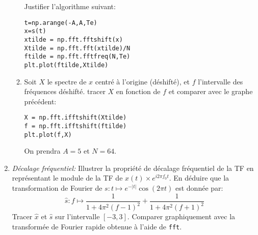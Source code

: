 \documentclass{article}
\begin{document}
\begin{enumerate}
\begin{enumerate}
 Justifier l'algorithme suivant:
\begin{verbatim}
t=np.arange(-A,A,Te)
x=s(t)
xtilde = np.fft.fftshift(x)
Xtilde = np.fft.fft(xtilde)/N
ftilde = np.fft.fftfreq(N,Te)
plt.plot(ftilde,Xtilde)
\end{verbatim}
\item Soit $X$ le spectre de $x$ centré à l'origine (déshifté), et $f$ l'intervalle des fréquences déshifté. tracer $X$ en fonction de $f$ et comparer avec le graphe précédent:
\begin{verbatim}
X = np.fft.ifftshift(Xtilde)
f = np.fft.ifftshift(ftilde)
plt.plot(f,X)
\end{verbatim}
On prendra $A=5$ et $N=64$.
\end{enumerate}
\item {\em Décalage fréquentiel:} Illustrer la propriété de décalage fréquentiel de la TF en représentant le module de la TF de $x(t) \times e^{i2\pi f_0t}$. En déduire que la transformation de Fourier de $s:t\mapsto e^{-|t|}\cos(2\pi t)$ est donnée par:
\[\hat s:f\mapsto \frac{1}{1+4\pi^2(f-1)^2}+\frac{1}{1+4\pi^2(f+1)^2}\]
Tracer $\hat x$ et $\hat s$ sur l'intervalle $[-3,3]$. Comparer graphiquement avec la transformée de Fourier rapide obtenue à l'aide de {\tt fft}.
\end{enumerate}
\end{document}
